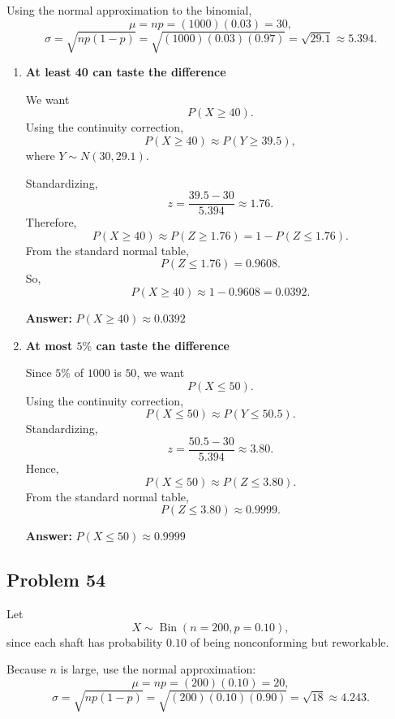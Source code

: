 \documentclass[11pt]{article}
\begin{document}
Using the normal approximation to the binomial,
\[
\mu=np=(1000)(0.03)=30,
\]
\[
\sigma=\sqrt{np(1-p)}=\sqrt{(1000)(0.03)(0.97)}=\sqrt{29.1}\approx 5.394.
\]

\begin{enumerate}
    \item[(a)] \textbf{At least 40 can taste the difference}

    We want
    \[
    P(X\ge 40).
    \]
    Using the continuity correction,
    \[
    P(X\ge 40)\approx P\left(Y\ge 39.5\right),
    \]
    where $Y\sim N(30,29.1)$.

    Standardizing,
    \[
    z=\frac{39.5-30}{5.394}\approx 1.76.
    \]
    Therefore,
    \[
    P(X\ge 40)\approx P(Z\ge 1.76)=1-P(Z\le 1.76).
    \]
    From the standard normal table,
    \[
    P(Z\le 1.76)=0.9608.
    \]
    So,
    \[
    P(X\ge 40)\approx 1-0.9608=0.0392.
    \]

    \textbf{Answer:} $P(X\ge 40)\approx 0.0392$

    \item[(b)] \textbf{At most $5\%$ can taste the difference}

    Since $5\%$ of $1000$ is $50$, we want
    \[
    P(X\le 50).
    \]
    Using the continuity correction,
    \[
    P(X\le 50)\approx P(Y\le 50.5).
    \]
    Standardizing,
    \[
    z=\frac{50.5-30}{5.394}\approx 3.80.
    \]
    Hence,
    \[
    P(X\le 50)\approx P(Z\le 3.80).
    \]
    From the standard normal table,
    \[
    P(Z\le 3.80)\approx 0.9999.
    \]

    \textbf{Answer:} $P(X\le 50)\approx 0.9999$
\end{enumerate}

\subsection*{Problem 54}

Let
\[
X\sim \operatorname{Bin}(n=200,p=0.10),
\]
since each shaft has probability $0.10$ of being nonconforming but reworkable.

Because $n$ is large, use the normal approximation:
\[
\mu=np=(200)(0.10)=20,
\]
\[
\sigma=\sqrt{np(1-p)}=\sqrt{(200)(0.10)(0.90)}=\sqrt{18}\approx 4.243.
\]
\end{document}
